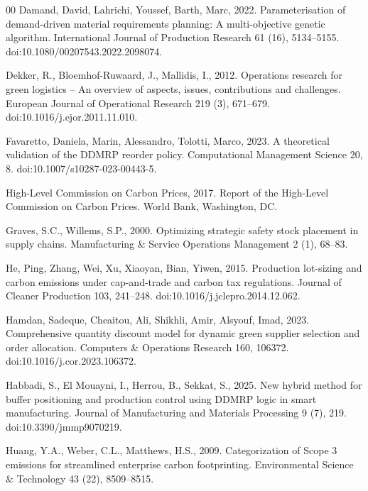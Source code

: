 \documentclass[preprint,12pt,authoryear]{elsarticle}
\begin{document}
\begin{thebibliography}{00}
Damand, David, Lahrichi, Youssef, Barth, Marc, 2022. Parameterisation of demand-driven material
requirements planning: A multi-objective genetic algorithm. International Journal of
Production Research 61 (16), 5134--5155. doi:10.1080/00207543.2022.2098074.

Dekker, R., Bloemhof-Ruwaard, J., Mallidis, I., 2012. Operations research for green
logistics -- An overview of aspects, issues, contributions and challenges. European
Journal of Operational Research 219 (3), 671--679. doi:10.1016/j.ejor.2011.11.010.

Favaretto, Daniela, Marin, Alessandro, Tolotti, Marco, 2023. A theoretical validation of the DDMRP
reorder policy. Computational Management Science 20, 8.
doi:10.1007/s10287-023-00443-5.

High-Level Commission on Carbon Prices, 2017. Report of the High-Level Commission
on Carbon Prices. World Bank, Washington, DC.

Graves, S.C., Willems, S.P., 2000. Optimizing strategic safety stock placement in
supply chains. Manufacturing \& Service Operations Management 2 (1), 68--83.

He, Ping, Zhang, Wei, Xu, Xiaoyan, Bian, Yiwen, 2015. Production lot-sizing and carbon emissions
under cap-and-trade and carbon tax regulations. Journal of Cleaner Production 103,
241--248. doi:10.1016/j.jclepro.2014.12.062.

Hamdan, Sadeque, Cheaitou, Ali, Shikhli, Amir, Alsyouf, Imad, 2023. Comprehensive quantity
discount model for dynamic green supplier selection and order allocation. Computers
\& Operations Research 160, 106372. doi:10.1016/j.cor.2023.106372.

Habbadi, S., El Mouayni, I., Herrou, B., Sekkat, S., 2025. New hybrid method for
buffer positioning and production control using DDMRP logic in smart manufacturing.
Journal of Manufacturing and Materials Processing 9 (7), 219.
doi:10.3390/jmmp9070219.

Huang, Y.A., Weber, C.L., Matthews, H.S., 2009. Categorization of Scope 3 emissions
for streamlined enterprise carbon footprinting. Environmental Science \& Technology
43 (22), 8509--8515.


\end{thebibliography}
\end{document}
